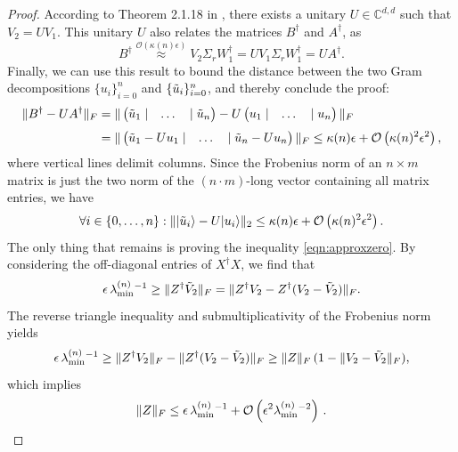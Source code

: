 \begin{proof}
According to Theorem 2.1.18 in \cite{Horn2013}, there exists a unitary $U\in\mathbb{C}^{d,d}$ such that $V_2=UV_1$. This unitary $U$ also relates the matrices $B^{\dag}$ and $A^{\dag}$, as
\begin{equation*}
B^{\dag}\stackrel{\mathcal{O}(\kappa(n)\epsilon)}{\approx}V_2\Sigma_r W_1^{\dag}= UV_1\Sigma_r W_1^{\dag}=UA^{\dag}.
\end{equation*} 
Finally, we can use this result to bound the distance between the two Gram decompositions $\{u_i\}_{i=0}^n$ and $\{\Tilde{u}_i\}_{i=0}^n$, and thereby conclude the proof:
\begin{align*}
\|B^{\dag}-UA^{\dag}\|_F&=\|
\begin{pmatrix}
\Tilde{u}_1 \;| & \dots & |\; \Tilde{u}_n
\end{pmatrix}-U
\begin{pmatrix}
u_1 \;| & \dots &  | \; u_n
\end{pmatrix} \|_F \\[0.3em]
& = \|
\begin{pmatrix}
\Tilde{u}_1-U u_1\; | &\dots& |\;\Tilde{u}_n-U u_n
\end{pmatrix}
\|_F\leq\kappa(n)\epsilon + \mathcal{O}\left(\kappa(n)^2\epsilon^2\right),
\end{align*}
where vertical lines delimit columns.
Since the Frobenius norm of an $n\times m$ matrix is just the two norm of the $(n\cdot m)$-long vector containing all matrix entries, we have
\begin{equation*}
\forall i\in\{0,\dots,n\}: \|\vert\Tilde{u}_i\rangle-U\vert u_i\rangle\|_2 \leq \kappa(n)\epsilon + \mathcal{O}\left(\kappa(n)^2\epsilon^2\right).
\end{equation*}
The only thing that remains is proving the inequality \ref{eqn:approxzero}. By considering the off-diagonal entries of $X^{\dag}X$, we find that
\begin{equation*}
\epsilon\thinspace\lambda_{\text{min}}^{(n)}{}^{-1} \geq \|Z^{\dag}\Tilde{V}_2\|_F=\|Z^{\dag}V_2 - Z^{\dag}(V_2-\Tilde{V}_2)\|_F.
\end{equation*}
The reverse triangle inequality and submultiplicativity of the Frobenius norm yields
\begin{equation*}
\epsilon\thinspace\lambda_{\text{min}}^{(n)}{}^{-1} \geq \|Z^{\dag}V_2\|_F - \|Z^{\dag}(V_2-\Tilde{V}_2)\|_F \geq \|Z\|_F\,(1-\|V_2-\Tilde{V}_2\|_F),
\end{equation*}
which implies
\begin{equation*}
\|Z\|_F \leq \epsilon\thinspace\lambda_{\text{min}}^{(n)}{}^{-1} + \mathcal{O}\left(\epsilon^2\lambda_{\text{min}}^{(n)}{}^{-2}\right)\thinspace.
\end{equation*}
\end{proof}

